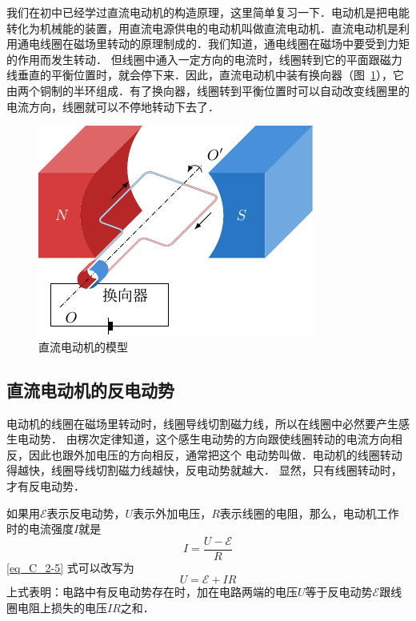 我们在初中已经学过直流电动机的构造原理，这里简单复习一下．电动机是把电能转化为机械能的装置，用直流电源供电的电动机叫做直流电动机．直流电动机是利用通电线圈在磁场里转动的原理制成的．我们知道，通电线圈在磁场中要受到力矩的作用而发生转动．
但线圈中通入一定方向的电流时，线圈转到它的平面跟磁力线垂直的平衡位置时，就会停下来．因此，直流电动机中装有换向器（图~\ref{fig_C_2-24}），它由两个铜制的半环组成．有了换向器，线圈转到平衡位置时可以自动改变线圈里的电流方向，线圈就可以不停地转动下去了．
\begin{figure}[htbp]
    \centering
    \includegraphics{fig/C/2-24.pdf}
    \caption{直流电动机的模型}\label{fig_C_2-24}
\end{figure}

\subsection{直流电动机的反电动势}

电动机的线圈在磁场里转动时，线圈导线切割磁力线，所以在线圈中必然要产生感生电动势．
由楞次定律知道，这个感生电动势的方向跟使线圈转动的电流方向相反，因此也跟外加电压的方向相反，通常把这个
电动势叫做．电动机的线圈转动得越快，线圈导线切割磁力线越快，反电动势就越大．
显然，只有线圈转动时，才有反电动势．

如果用$\mathcal{E}$表示反电动势，$U$表示外加电压，$R$表示线圈的电阻，那么，电动机工作时的电流强度$I$就是
\begin{equation}\label{eq_C_2-5}
    I=\frac{U-\mathcal{E}}{R}
\end{equation}
 \eqref{eq_C_2-5} 式可以改写为
\begin{equation}\label{eq_C_2-6}
    U=\mathcal{E}+IR
\end{equation}
上式表明：电路中有反电动势存在时，加在电路两端的电压$U$等于反电动势$\mathcal{E}$跟线圈电阻上损失的电压$IR$之和．

